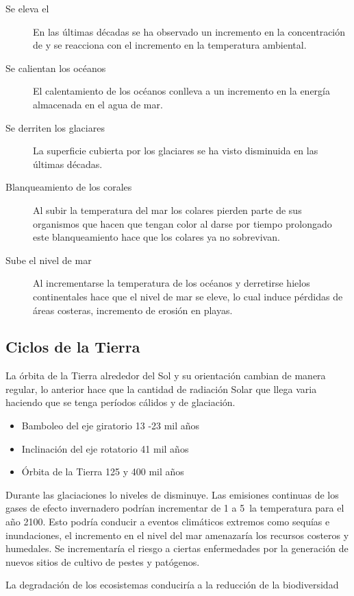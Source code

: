 \begin{description}
\item[Se eleva el ] En las últimas décadas se ha observado un incremento en la concentración de  y se reacciona con el incremento en la temperatura  ambiental.
\item[Se calientan los océanos]  El calentamiento de los océanos conlleva a un incremento en la energía almacenada en el  agua de mar. 
\item[Se derriten los glaciares ]  La superficie cubierta por los glaciares se ha visto disminuida en las últimas décadas.
\item[ Blanqueamiento de los corales] Al subir la temperatura del mar los colares pierden parte de sus organismos que hacen que tengan color al darse por tiempo prolongado este blanqueamiento hace que los colares ya no sobrevivan. 
\item[ Sube el nivel de mar]   Al incrementarse la temperatura de los océanos y derretirse hielos continentales hace que el nivel de mar se eleve, lo cual induce pérdidas de áreas costeras, incremento de erosión en playas.
\end{description}

\subsection{Ciclos de la Tierra}
La órbita de la Tierra alrededor del Sol y su orientación cambian de manera regular, lo anterior hace que la cantidad de radiación Solar que llega varia haciendo que se tenga períodos cálidos y de glaciación. 
\begin{itemize}
\item Bamboleo del eje giratorio 13 -23 mil años
\item Inclinación del eje rotatorio 41 mil años
\item Órbita de la Tierra 125 y 400 mil años 
\end{itemize}

Durante las glaciaciones lo niveles de  disminuye. 
Las emisiones continuas de los gases de efecto invernadero podrían incrementar de 1 a 5\celsius\, la temperatura para el año 2100. Esto podría conducir a eventos climáticos extremos como sequías e inundaciones, el incremento en el nivel  del mar amenazaría los recursos costeros y humedales. Se incrementaría el riesgo a ciertas enfermedades por la generación de nuevos sitios de cultivo de pestes y patógenos.

La degradación de los ecosistemas conduciría a la reducción de la biodiversidad

